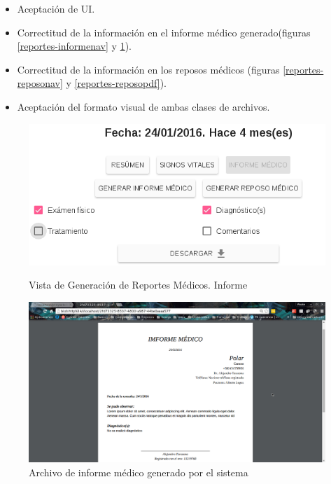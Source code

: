     \begin{itemize}
        \item Aceptación de UI.
        \item Correctitud de la información en el informe médico generado(figuras \ref{reportes-informenav} y \ref{reportes-informepdf}).
        \item Correctitud de la información en los reposos médicos (figuras \ref{reportes-reposonav} y \ref{reportes-reposopdf}).
        \item Aceptación del formato visual de ambas clases de archivos.
    \end{itemize}
    \begin{figure}[htb!]
        \begin{minipage}{0.45\textwidth}
            \begin{center}
                \includegraphics[width=\linewidth,keepaspectratio=true]{figures/reportes-informenav}
            \end{center}
            \caption{Vista de Generación de Reportes Médicos. Informe}
            \label{reportes-informenav}
        \end{minipage}
        \hspace*{\fill}
        \begin{minipage}{0.45\textwidth}
            \begin{center}
                \includegraphics[width=\linewidth,keepaspectratio=true]{figures/reportes-informepdf}
            \end{center}
            \caption{Archivo de informe médico generado por el sistema}
            \label{reportes-informepdf}
        \end{minipage}
    \end{figure}
    
